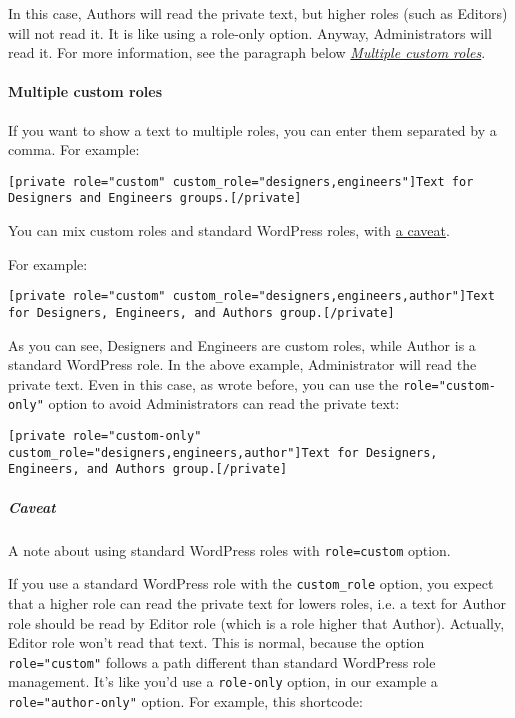 \documentclass[a4paper,10pt]{article}
\begin{document}
In this case, Authors will read the private text, but higher roles (such as Editors) will not read it. It is like using a role-only option. Anyway, Administrators will read it. For more information, see the paragraph below \textit{\hyperref[multiple-custom-roles]{Multiple custom roles}}.

\paragraph{Multiple custom roles}\label{multiple-custom-roles}

If you want to show a text to multiple roles, you can enter them separated by a comma. For example:

\begin{lstlisting}
[private role="custom" custom_role="designers,engineers"]Text for Designers and Engineers groups.[/private]
\end{lstlisting}

You can mix custom roles and standard WordPress roles, with \hyperref[caveat]{a caveat}.

For example:

\begin{lstlisting}
[private role="custom" custom_role="designers,engineers,author"]Text for Designers, Engineers, and Authors group.[/private]
\end{lstlisting}

As you can see, Designers and Engineers are custom roles, while Author is a standard WordPress role. In the above example, Administrator will read the private text. Even in this case, as wrote before, you can use the \verb+role="custom-only"+ option to avoid Administrators can read the private text:

\begin{lstlisting}
[private role="custom-only" custom_role="designers,engineers,author"]Text for Designers, Engineers, and Authors group.[/private]
\end{lstlisting}

\subparagraph{Caveat} \label{caveat}

A note about using standard WordPress roles with \verb+role=custom+ option.

If you use a standard WordPress role with the \verb+custom_role+ option, you expect that a higher role can read the private text for lowers roles, i.e. a text for Author role should be read by Editor role (which is a role higher that Author). Actually, Editor role won't read that text. This is normal, because the option \verb+role="custom"+ follows a path different than standard WordPress role management. It's like you'd use a \verb+role-only+ option, in our example a \verb+role="author-only"+ option. For example, this shortcode:
\end{document}
